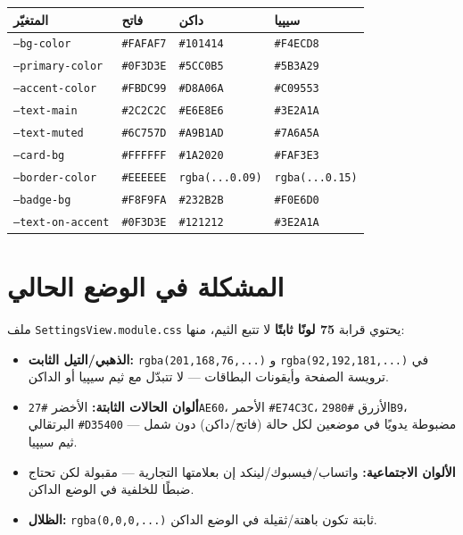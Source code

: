 \documentclass[11pt]{article}
\begin{document}
\vspace{6pt}
\renewcommand{\arraystretch}{1.35}
\begin{longtable}{@{}p{} p{} p{} p{}@{}}
\toprule
\textbf{المتغيّر} & \textbf{فاتح} & \textbf{داكن} & \textbf{سيپيا} \\
\midrule
\endhead
\texttt{--bg-color}        & \texttt{\#FAFAF7} & \texttt{\#101414} & \texttt{\#F4ECD8} \\
\texttt{--primary-color}   & \texttt{\#0F3D3E} & \texttt{\#5CC0B5} & \texttt{\#5B3A29} \\
\texttt{--accent-color}    & \texttt{\#FBDC99} & \texttt{\#D8A06A} & \texttt{\#C09553} \\
\texttt{--text-main}       & \texttt{\#2C2C2C} & \texttt{\#E6E8E6} & \texttt{\#3E2A1A} \\
\texttt{--text-muted}      & \texttt{\#6C757D} & \texttt{\#A9B1AD} & \texttt{\#7A6A5A} \\
\texttt{--card-bg}         & \texttt{\#FFFFFF} & \texttt{\#1A2020} & \texttt{\#FAF3E3} \\
\texttt{--border-color}    & \texttt{\#EEEEEE} & \texttt{rgba(...0.09)} & \texttt{rgba(...0.15)} \\
\texttt{--badge-bg}        & \texttt{\#F8F9FA} & \texttt{\#232B2B} & \texttt{\#F0E6D0} \\
\texttt{--text-on-accent}  & \texttt{\#0F3D3E} & \texttt{\#121212} & \texttt{\#3E2A1A} \\
\bottomrule
\end{longtable}
\renewcommand{\arraystretch}{1.0}

\section{المشكلة في الوضع الحالي}

\begin{warnbox}
ملف \texttt{SettingsView.module.css} يحتوي قرابة \textbf{75 لونًا ثابتًا} لا تتبع الثيم، منها:
\begin{itemize}
  \item \textbf{الذهبي/التيل الثابت:} \texttt{rgba(201,168,76,...)} و \texttt{rgba(92,192,181,...)} في
        ترويسة الصفحة وأيقونات البطاقات — لا تتبدّل مع ثيم سيپيا أو الداكن.
  \item \textbf{ألوان الحالات الثابتة:} الأخضر \texttt{\#27AE60}، الأحمر \texttt{\#E74C3C}، الأزرق
        \texttt{\#2980B9}، البرتقالي \texttt{\#D35400} — مضبوطة يدويًا في موضعين لكل حالة (فاتح/داكن)
        دون شمل ثيم سيپيا.
  \item \textbf{الألوان الاجتماعية:} واتساب/فيسبوك/لينكد إن بعلامتها التجارية — مقبولة لكن تحتاج ضبطًا
        للخلفية في الوضع الداكن.
  \item \textbf{الظلال:} \texttt{rgba(0,0,0,...)} ثابتة تكون باهتة/ثقيلة في الوضع الداكن.
\end{itemize}
\end{warnbox}
\end{document}
